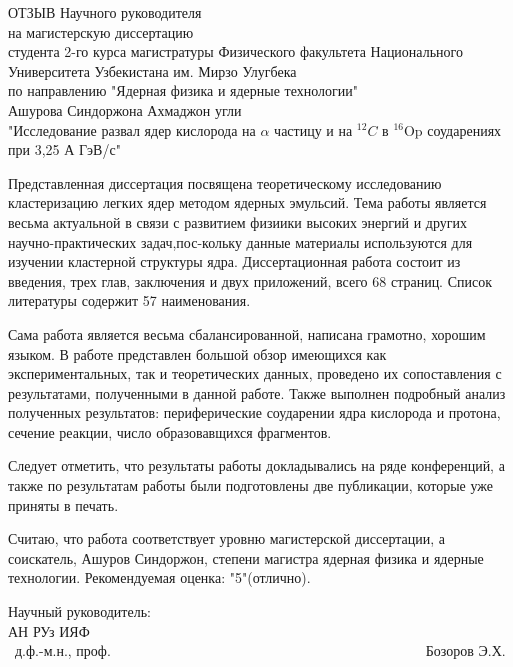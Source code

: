 \documentclass[14pt]{scrarticle}
\begin{document}
\begin{titlepage}
\begin{center}
    ОТЗЫВ Научного руководителя\\
    на магистерскую диссертацию\\ студента 2-го курса магистратуры Физического факультета Национального Университета Узбекистана им. Мирзо Улугбека \\по направлению "Ядерная физика и ядерные технологии"\\

    Ашурова Синдоржона Ахмаджон угли\\

    "Исследование развал ядер кислорода на $\alpha$ частицу и на $^{12}C$ в $^{16}$Op соударениях при 3,25 А ГэВ/с"
\end{center}

Представленная диссертация посвящена теоретическому исследованию кластеризацию легких ядер методом ядерных эмульсий. Тема работы является весьма актуальной в связи с развитием физиики высоких энергий и других научно-практических задач,пос-кольку данные материалы используются для изучении кластерной структуры ядра. Диссертационная работа состоит из введения, трех глав, заключения и двух приложений, всего 68 страниц. Список литературы содержит 57 наименования. 


Сама работа является весьма сбалансированной, написана грамотно, хорошим языком. В работе представлен большой обзор имеющихся как экспериментальных, так и теоретических данных, проведено их сопоставления с результатами, полученными в данной работе. Также выполнен подробный анализ полученных результатов: периферические соударении ядра кислорода и протона, сечение реакции, число образовавщихся фрагментов.

Следует отметить, что результаты работы докладывались на ряде конференций, а также по результатам работы были подготовлены две публикации, которые уже приняты в печать. 

Считаю,   что   работа соответствует уровню магистерской диссертации, а соискатель, Ашуров Синдоржон, степени магистра ядерная физика и ядерные технологии. Рекомендуемая оценка: "5"(отлично).
\vfill

\noindent Научный руководитель:\\
АН РУз ИЯФ \\\
д.ф.-м.н., проф.\ \ \ \ \ \ \  \ \ \ \ \ \ \ \ \ \ \ \ \ \ \ \ \ \ \ \ \ \ \ \ \ \ \ \ \ \ \ \ \ \ \ \ \ \  Бозоров Э.Х.

\vfill
\end{titlepage}
\end{document}
